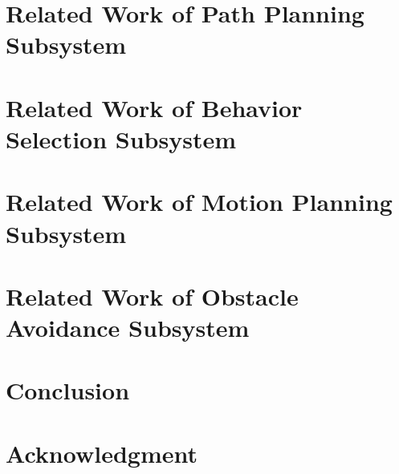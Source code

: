 \documentclass[conference]{IEEEtran}
\begin{document}
\section{Related Work of Path Planning Subsystem}\label{sec:path_planner}
\section{Related Work of Behavior Selection Subsystem}\label{sec:behavior_selector}
\section{Related Work of Motion Planning Subsystem}\label{sec:motion_planner}
\section{Related Work of Obstacle Avoidance Subsystem}\label{sec:obstacle_avoider}
\section{Conclusion}


\section*{Acknowledgment}



 
\end{document}
